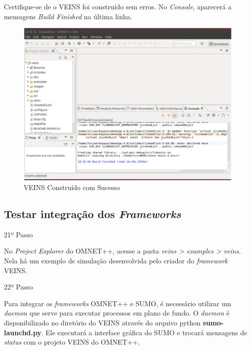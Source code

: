 \documentclass[
12pt,				%
openright,			%
oneside,			%
a4paper,			%
brazil,				%
]{abntex2}
\begin{document}
{\begin{anexosenv}
                \par Certifique-se de o VEINS foi construído sem erros. No \textit{Console}, aparecerá a mensagens \textit{Build Finished} na última linha.
		            
                \begin{figure} [H]
	                \centering
	                \includegraphics[scale=.27]{figuras/aneB/62VeinsConstruido}
	                \caption{\label{fig_62}VEINS Construído com Sucesso}
                \end{figure}
				\newpage
        	    \subsection{Testar integração dos \textit{Frameworks}}
				        	
            	\begin{description}
	                \item[21º Passo]
	            \end{description}
	            \par No \textit{Project Explorer} do OMNET++, acesse a pasta \textit{veins > examples > veins}. Nela há um exemplo de simulação desenvolvida pelo criador do \textit{framework} VEINS.
                    
        	
            	\begin{description}
	                \item[22º Passo]
	            \end{description}
	            \par Para integrar os \textit{frameworks} OMNET++ e SUMO, é necessário utilizar um \textit{daemon} que serve para executar processos em plano de fundo. O \textit{daemon} é disponibilizado no diretório do VEINS através do arquivo python \textbf{sumo-launchd.py}. Ele executará a interface gráfica do SUMO e trocará mensagens de \textit{status} com o projeto VEINS do OMNET++.


\end{anexosenv}}
\end{document}
